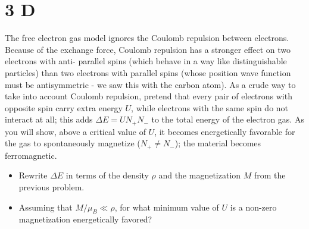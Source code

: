 \documentclass{article}
\begin{document}
\hfil

\hfil

\section*{3 D}

\begin{ques}
The free electron gas model ignores the Coulomb repulsion between electrons. Because
of the exchange force, Coulomb repulsion has a stronger effect on two electrons with anti-
parallel spins (which behave in a way like distinguishable particles) than two electrons with
parallel spins (whose position wave function must be antisymmetric - we saw this with the
carbon atom). As a crude way to take into account Coulomb repulsion, pretend that every
pair of electrons with opposite spin carry extra energy $U$, while electrons with the same
spin do not interact at all; this adds $\Delta E = U N_+ N_-$ to the total energy of the electron
gas. As you will show, above a critical value of $U$, it becomes energetically favorable for
the gas to spontaneously magnetize ($N_+ \neq N_-$); the material becomes ferromagnetic.
\begin{itemize}
    \item[(a)] Rewrite $\Delta E$ in terms of the density $\rho$ and the magnetization $M$ from the previous
problem.

    \item[(b)] Assuming that $M/\mu_B \ll \rho$, for what minimum value of $U$ is a non-zero magnetization energetically favored?
\end{itemize}
\end{ques}
\end{document}
